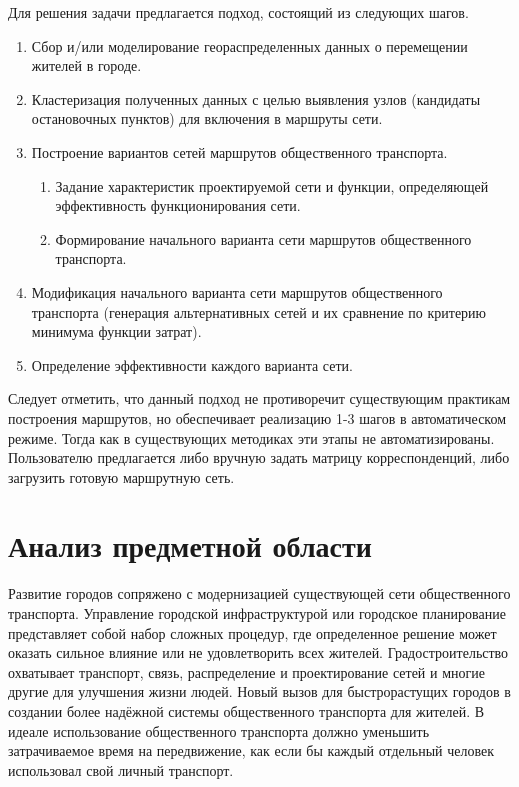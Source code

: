 Для решения задачи предлагается подход, состоящий из следующих шагов. 
\begin{enumerate}
    \item Сбор и/или моделирование геораспределенных данных о перемещении жителей в городе.
    \item Кластеризация полученных данных с целью выявления узлов (кандидаты остановочных пунктов) для 
        включения в маршруты сети.
    \item Построение вариантов сетей маршрутов общественного транспорта.
    \begin{enumerate}
        \item Задание характеристик проектируемой сети и функции, определяющей эффективность 
            функционирования сети.
        \item Формирование начального варианта сети маршрутов общественного транспорта.
    \end{enumerate}
    \item Модификация начального варианта сети маршрутов общественного транспорта (генерация 
        альтернативных сетей и их сравнение по критерию минимума функции затрат).
    \item Определение эффективности каждого варианта сети.
\end{enumerate}
Следует отметить, что данный подход не противоречит существующим практикам построения маршрутов, но 
обеспечивает реализацию 1-3 шагов в автоматическом режиме. Тогда как в существующих методиках \cite{bib:9} 
эти этапы не автоматизированы. Пользователю предлагается либо вручную задать матрицу корреспонденций, 
либо загрузить готовую маршрутную сеть.

\section{Анализ предметной области}
Развитие городов сопряжено с модернизацией существующей сети общественного транспорта. Управление городской 
инфраструктурой или городское планирование представляет собой набор сложных процедур, где определенное 
решение может оказать сильное влияние или не удовлетворить всех жителей. Градостроительство охватывает 
транспорт, связь, распределение и проектирование сетей и многие другие для улучшения жизни людей. Новый 
вызов для быстрорастущих городов в создании более надёжной системы общественного транспорта для жителей. 
В идеале использование общественного транспорта должно уменьшить затрачиваемое время на передвижение, как 
если бы каждый отдельный человек использовал свой личный транспорт.

